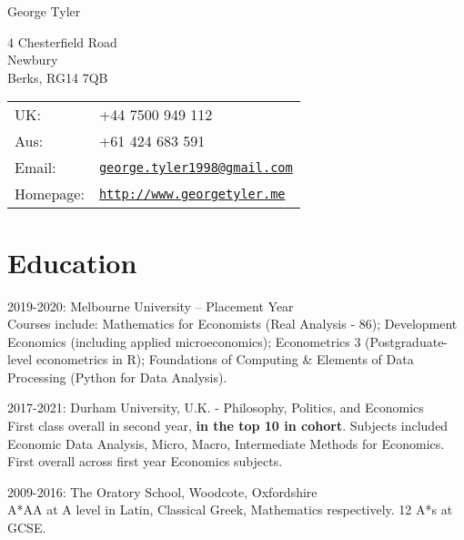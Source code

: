 \documentclass[letterpaper]{article}
\def\name{George Tyler}
\renewenvironment{itemize}{
  \begin{list}{}{
    \setlength{\leftmargin}{1.5em}
  }
}{
  \end{list}
}
\begin{document}
{\huge \name}


\vspace{0.25in}

\begin{minipage}{0.45\linewidth}
  4 Chesterfield Road \\
  Newbury \\
  Berks, RG14 7QB
\end{minipage}
\begin{minipage}{0.45\linewidth}
  \begin{tabular}{ll}
    UK: & +44 7500 949 112 \\
    Aus: &  +61 424 683 591 \\
    Email: & \href{mailto:george.tyler1998@gmail.com}{\tt george.tyler1998@gmail.com} \\
    Homepage: & \href{http://www.georgetyler.me}{\tt http://www.georgetyler.me} \\
  \end{tabular}
\end{minipage}





\section*{Education}

\begin{itemize}
  \item 2019-2020: Melbourne University – Placement Year \\
  Courses include: Mathematics for Economists (Real Analysis - 86); Development Economics (including applied microeconomics); Econometrics 3 (Postgraduate-level econometrics in R); Foundations of Computing & Elements of Data Processing (Python for Data Analysis).

  \item 2017-2021: Durham University, U.K. - Philosophy, Politics, and Economics \\
  First class overall in second year, \textbf{in the top 10 in cohort}. Subjects included Economic Data Analysis, Micro, Macro, Intermediate Methods for Economics. First overall across first year Economics subjects. 

  \item 2009-2016: The Oratory School, Woodcote, Oxfordshire \\
  A*AA at A level in Latin, Classical Greek, Mathematics respectively. 12 A*s at GCSE.
  
\end{itemize}
\end{document}
